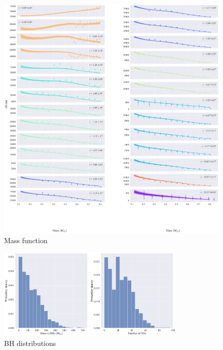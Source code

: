 \begin{figure}
	\begin{center}
		\includegraphics[width=\textwidth]{figures/low_bin_model/mass_fun.png}
	\end{center}
	\caption{Mass function}
	\label{fig:low_bin_model_mass_fun}
\end{figure}



\begin{figure}
	\centering
	\includegraphics[width=0.8\textwidth]{figures/low_bin_model/BH_dists.png}
	\caption{BH distributions}
	\label{fig:low_bin_model_BH_dists}
\end{figure}






